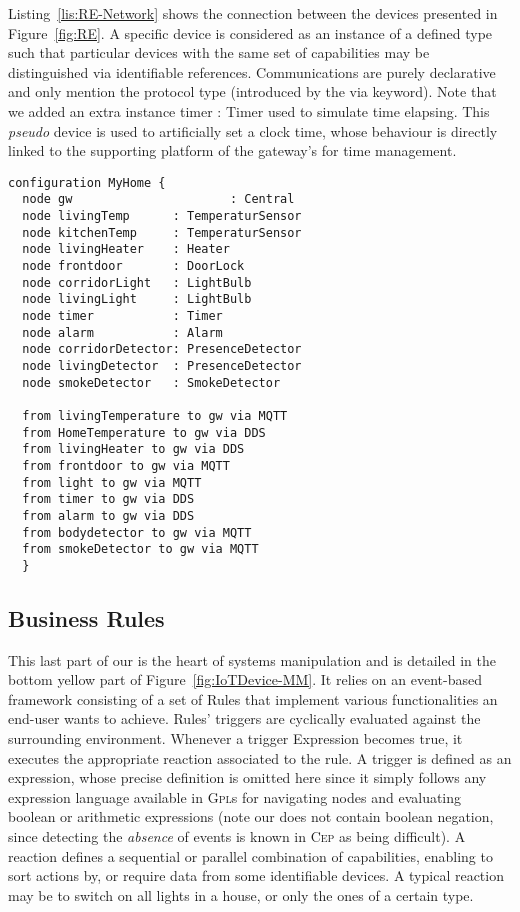 Listing~\ref{lis:RE-Network} shows the connection between the devices presented in Figure~\ref{fig:RE}. A specific device is considered as an instance of a defined type such that particular devices with the same set of capabilities may be distinguished via identifiable references. Communications are purely declarative and only mention the protocol type (introduced by the \textsf{via} keyword). Note that we added an extra instance \textsf{timer : Timer} used to simulate time elapsing. This \textit{pseudo} device is used to artificially set a clock time, whose behaviour is directly linked to the supporting platform of the gateway's for time management.
	
  \begin{lstlisting}[label=lis:RE-Network,language=iotdsl,caption=Network Configuration for Alice's House]	
  configuration MyHome {
  node gw 					   : Central
  node livingTemp      : TemperaturSensor
  node kitchenTemp     : TemperaturSensor
  node livingHeater    : Heater
  node frontdoor       : DoorLock
  node corridorLight   : LightBulb
  node livingLight     : LightBulb
  node timer           : Timer
  node alarm           : Alarm
  node corridorDetector: PresenceDetector
  node livingDetector  : PresenceDetector
  node smokeDetector   : SmokeDetector
  
  from livingTemperature to gw via MQTT
  from HomeTemperature to gw via DDS
  from livingHeater to gw via DDS
  from frontdoor to gw via MQTT
  from light to gw via MQTT
  from timer to gw via DDS
  from alarm to gw via DDS
  from bodydetector to gw via MQTT
  from smokeDetector to gw via MQTT
  }
  \end{lstlisting}
\subsection{Business Rules}
\label{sec:IoTDSL-BusinessRules}

This last part of our \DSL is the heart of \IOT systems manipulation and is detailed in the bottom yellow part of Figure~\ref{fig:IoTDevice-MM}. It relies on an event-based framework consisting of a set of \textsf{Rule}s that implement various functionalities an end-user wants to achieve. Rules' \textsf{trigger}s are cyclically evaluated against the surrounding environment. Whenever a \textsf{trigger} \textsf{Expression} becomes true, it executes the appropriate \textsf{reaction} associated to the rule. A \textsf{trigger} is defined as an expression, whose precise definition is omitted here since it simply follows any expression language available in \textsc{Gpl}s for navigating nodes and evaluating boolean or arithmetic expressions (note our \DSL does not contain boolean negation, since detecting the \emph{absence} of events is known in \textsc{Cep} as being difficult). A \textsf{reaction} defines a sequential or parallel combination of capabilities, enabling to sort actions by, or require data from some identifiable devices. A typical \textsf{reaction} may be to switch on all lights in a house, or only the ones of a certain type.

